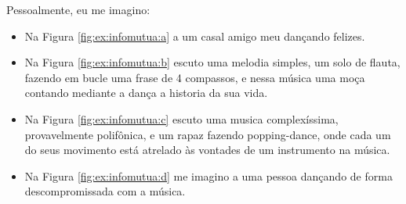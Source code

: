 Pessoalmente, eu me imagino:
\begin{itemize}
\item Na Figura \ref{fig:ex:infomutua:a} a um casal amigo meu dançando felizes.
\item Na Figura \ref{fig:ex:infomutua:b} escuto uma melodia simples, um solo de flauta,
fazendo em bucle uma frase de 4 compassos, 
e nessa música uma moça contando mediante a dança a historia da sua vida.
\item Na Figura \ref{fig:ex:infomutua:c} escuto uma musica complexíssima, 
provavelmente polifônica, e um rapaz fazendo popping-dance,
onde cada um do seus movimento está atrelado às vontades de um instrumento na música.
\item Na Figura \ref{fig:ex:infomutua:d} me imagino a uma pessoa dançando de forma descompromissada com a música.
\end{itemize}

